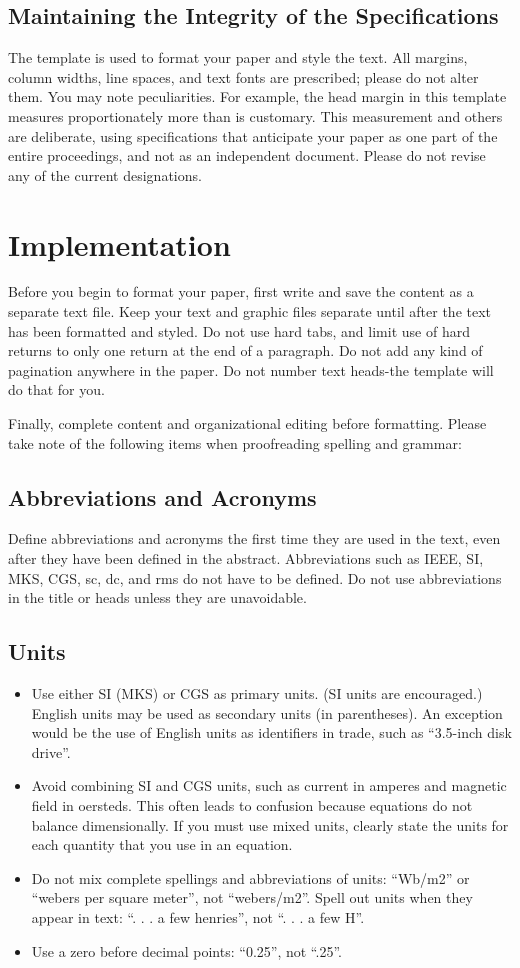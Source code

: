\documentclass[10pt, conference, a4paper, compsocconf]{IEEEtran}
\begin{document}
\subsection{Maintaining the Integrity of the Specifications}
The template is used to format your paper and style the text. All margins, column widths, line spaces, and text fonts are prescribed; please do not alter them. You may note peculiarities. For example, the head margin in this template measures proportionately more than is customary. This measurement and others are deliberate, using specifications that anticipate your paper as one part of the entire proceedings, and not as an independent document. Please do not revise any of the current designations.

\section{Implementation}
Before you begin to format your paper, first write and save the content as a separate text file. Keep your text and graphic files separate until after the text has been formatted and styled. Do not use hard tabs, and limit use of hard returns to only one return at the end of a paragraph. Do not add any kind of pagination anywhere in the paper. Do not number text heads-the template will do that for you.


Finally, complete content and organizational editing before formatting. Please take note of the following items when proofreading spelling and grammar:
\subsection{Abbreviations and Acronyms}
Define abbreviations and acronyms the first time they are used in the text, even after they have been defined in the abstract. Abbreviations such as IEEE, SI, MKS, CGS, sc, dc, and rms do not have to be defined. Do not use abbreviations in the title or heads unless they are unavoidable.
\subsection{Units}
\begin{itemize}
\item Use either SI (MKS) or CGS as primary units. (SI units are encouraged.) English units may be used as secondary units (in parentheses). An exception would be the use of English units as identifiers in trade, such as “3.5-inch disk drive”.
\item Avoid combining SI and CGS units, such as current in amperes and magnetic field in oersteds. This often leads to confusion because equations do not balance dimensionally. If you must use mixed units, clearly state the units for each quantity that you use in an equation.
\item Do not mix complete spellings and abbreviations of units: “Wb/m2” or “webers per square meter”, not “webers/m2”.  Spell out units when they appear in text: “. . . a few henries”, not “. . . a few H”.
\item Use a zero before decimal points: “0.25”, not “.25”.
\end{itemize}
\end{document}
